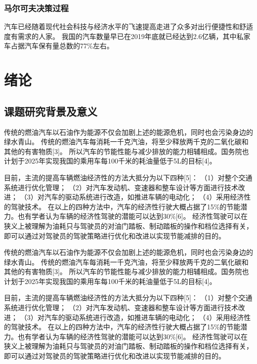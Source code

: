 \subsection{马尔可夫决策过程}
汽车已经随着现代社会科技与经济水平的飞速提高走进了众多对出行便捷性和舒适度有需求的人家。
我国的汽车数量早已在2019年底就已经达到2.6亿辆，其中私家车占据汽车保有量总数的77\%左右。
\chapter{绪论}
\section{课题研究背景及意义}
\par  传统的燃油汽车以石油作为能源不仅会加剧上述的能源危机，同时也会污染身边的绿水青山。
传统的燃油汽车每消耗一千克汽油，将至少释放两千克的二氧化碳和其他的有害物质[3]。
所以汽车的节能性能与减少排放的能力相辅相成。国务院也计划于2025年实现我国的乘用车每100千米的耗油量低于5L的目标[4]。

\par  目前，主流的提高车辆燃油经济性的方法大抵分为以下四种[5]：
    （1）对整个交通系统进行优化管理；
    （2）对汽车发动机、变速器和整车设计等方面进行技术改进；
    （3）对汽车的驱动系统进行改造，如推进车辆的电动化；
    （4）采用经济性的驾驶技术。
在以上的四种方法中，汽车的经济性行驶大概占据了15\%的节能潜力。也有学者认为车辆的经济性驾驶的潜能可以达到30\%[6]。
经济性驾驶可以在狭义上被理解为油耗只与驾驶员的对油门踏板、制动踏板的操作和档位选择有关，
即可以通过对驾驶员的驾驶策略进行优化和改进以实现节能减排的目的。

\par  传统的燃油汽车以石油作为能源不仅会加剧上述的能源危机，同时也会污染身边的绿水青山。
传统的燃油汽车每消耗一千克汽油，将至少释放两千克的二氧化碳和其他的有害物质[3]。
所以汽车的节能性能与减少排放的能力相辅相成。国务院也计划于2025年实现我国的乘用车每100千米的耗油量低于5L的目标[4]。

\par  目前，主流的提高车辆燃油经济性的方法大抵分为以下四种[5]：
    （1）对整个交通系统进行优化管理；
    （2）对汽车发动机、变速器和整车设计等方面进行技术改进；
    （3）对汽车的驱动系统进行改造，如推进车辆的电动化；
    （4）采用经济性的驾驶技术。
在以上的四种方法中，汽车的经济性行驶大概占据了15\%的节能潜力。也有学者认为车辆的经济性驾驶的潜能可以达到30\%[6]。
经济性驾驶可以在狭义上被理解为油耗只与驾驶员的对油门踏板、制动踏板的操作和档位选择有关，
即可以通过对驾驶员的驾驶策略进行优化和改进以实现节能减排的目的。

